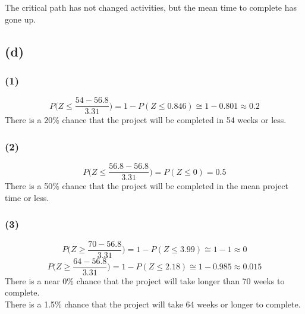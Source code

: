 \documentclass{article}
\begin{document}
	\noindent The critical path has not changed activities, but the mean time to complete has gone up.
	
	\subsection*{(d)}
	\subsubsection*{(1)}
	\begin{equation*}
		P\bigg(Z\le \frac{54-56.8}{3.31}\bigg) = 1 - P(Z \le 0.846) \cong 1 - 0.801 \approx 0.2
	\end{equation*}
	There is a 20\% chance that the project will be completed in 54 weeks or less.
	
	\subsubsection*{(2)}
	\begin{equation*}
		P\bigg(Z\le \frac{56.8-56.8}{3.31}\bigg) = P(Z \le 0) =  0.5
	\end{equation*}
	There is a 50\% chance that the project will be completed in the mean project time or less.
	
	\subsubsection*{(3)}
	\begin{equation*}
		P\bigg(Z\ge \frac{70-56.8}{3.31}\bigg) = 1 - P(Z \le 3.99) \cong 1 - 1 \approx 0
	\end{equation*}
	\begin{equation*}
		P\bigg(Z\ge \frac{64-56.8}{3.31}\bigg) = 1 - P(Z \le 2.18) \cong 1 - 0.985 \approx 0.015
	\end{equation*}
	There is a near 0\% chance that the project will take longer than 70 weeks to complete.\\
	There is a 1.5\% chance that the project will take 64 weeks or longer to complete.
	
\end{document}
